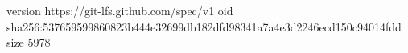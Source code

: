 version https://git-lfs.github.com/spec/v1
oid sha256:537659599860823b444e32699db182dfd98341a7a4e3d2246ecd150c94014fdd
size 5978
